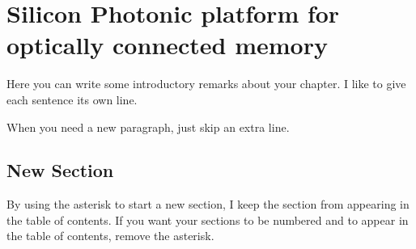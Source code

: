 \pagestyle{plain}

\chapter[Silicon Photonic platform for optically connected memory][Top of Page Title]{Silicon Photonic platform for optically connected memory}

Here you can write some introductory remarks about your chapter.
I like to give each sentence its own line.

When you need a new paragraph, just skip an extra line.

\section{New Section}

By using the asterisk to start a new section, I keep the section from appearing in the table of contents.
If you want your sections to be numbered and to appear in the table of contents, remove the asterisk.


